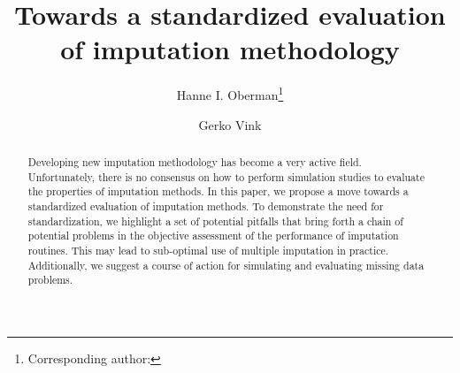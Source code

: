 \documentclass[bimj,fleqn]{w-art}
\begin{document}
\keywords{Evaluation; Imputation; Missing data; Simulation studies;\\ [1pc]
\noindent \hspace*{-4pc} Supporting Information for this article is available from \underline{gerkovink.com/evaluation}.\\
}  %

\title[Towards a standardized evaluation of imputation methodology]{Towards a standardized evaluation of imputation methodology}
\author[Oberman]{Hanne I. Oberman\footnote{Corresponding author: {}}} 
\address[\inst{1}]{Departement of Methodology \& Statistics, Padualaan 14, 3584 CH Utrecht, The Netherlands}
\author[Vink]{Gerko Vink}
   

\begin{abstract}
Developing new imputation methodology has become a very active field. Unfortunately, there is no consensus on how to perform simulation studies to evaluate the properties of imputation methods. In this paper, we propose a move towards a standardized evaluation of imputation methods. To demonstrate the need for standardization, we highlight a set of potential pitfalls that bring forth a chain of potential problems in the objective assessment of the performance of imputation routines. This may lead to sub-optimal use of multiple imputation in practice. Additionally, we suggest a course of action for simulating and evaluating missing data problems.
\end{abstract}



\maketitle          %
\end{document}

